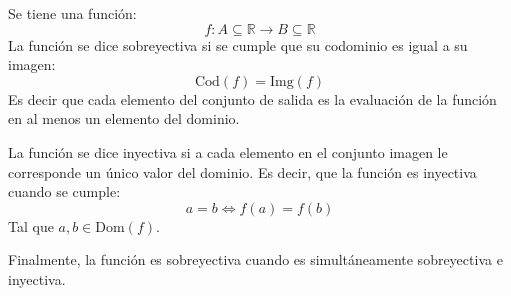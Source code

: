 \begin{definition}
    Se tiene una función:
    \begin{equation*}
        f: A \subseteq \mathbb{R} \rightarrow B \subseteq \mathbb{R}
    \end{equation*}
    La función se dice sobreyectiva si se cumple que su codominio es igual a su imagen: 
    \begin{equation*}
        \text{Cod}(f)=\text{Img}(f)
    \end{equation*}
    Es decir que cada elemento del conjunto de salida es la evaluación de la función en al menos un elemento del
    dominio.

    La función se dice inyectiva si a cada elemento en el conjunto imagen le corresponde un único
    valor del dominio. Es decir, que la función es inyectiva cuando se cumple:
    \begin{equation*}
        a=b \Leftrightarrow f(a)=f(b)
    \end{equation*}
    Tal que $a,b\in \text{Dom}(f)$.

    Finalmente, la función es sobreyectiva cuando es simultáneamente sobreyectiva e inyectiva.
\end{definition}
